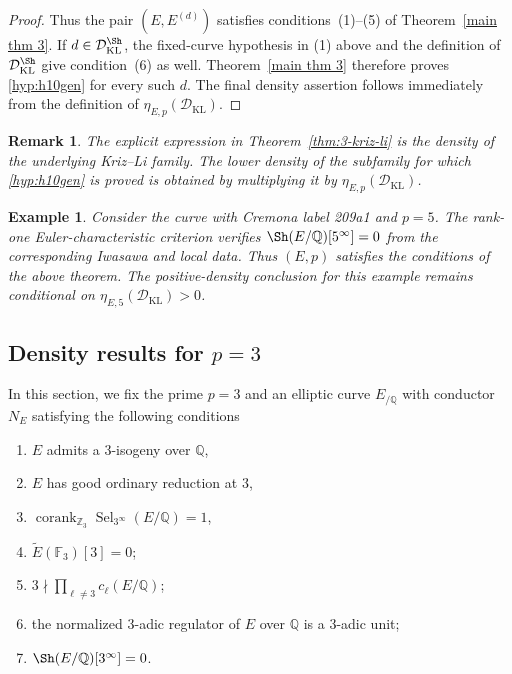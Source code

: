 \documentclass[12pt]{amsart}
\newtheorem{remark}[theorem]{Remark}
\newtheorem{example}[theorem]{Example}
\newcommand{\Z}{\mathbb{Z}}
\newcommand{\Q}{\mathbb{Q}}
\newcommand{\F}{\mathbb{F}}
\newcommand{\op}[1]{\operatorname{#1}}
\numberwithin{equation}{section}
\begin{document}
\begin{proof}
Thus the pair $(E,E^{(d)})$ satisfies conditions~(1)--(5) of Theorem~\ref{main thm 3}. If $d\in\mathcal D_{\mathrm{KL}}^{\Sh}$, the fixed-curve hypothesis in (1) above and the definition of $\mathcal D_{\mathrm{KL}}^{\Sh}$ give condition~(6) as well. Theorem~\ref{main thm 3} therefore proves \eqref{hyp:h10gen} for every such $d$. The final density assertion follows immediately from the definition of $\eta_{E,p}(\mathcal D_{\mathrm{KL}})$.
\end{proof}
\begin{remark}
The explicit expression in Theorem~\ref{thm:3-kriz-li} is the density of the underlying Kriz--Li family. The lower density of the subfamily for which \eqref{hyp:h10gen} is proved is obtained by multiplying it by $\eta_{E,p}(\mathcal D_{\mathrm{KL}})$.
\end{remark}
\begin{example}
Consider the curve with Cremona label 209a1 and $p=5$. The rank-one Euler-characteristic criterion verifies $\Sh(E/\Q)[5^\infty]=0$ from the corresponding Iwasawa and local data. Thus $(E,p)$ satisfies the conditions of the above theorem. The positive-density conclusion for this example remains conditional on $\eta_{E,5}(\mathcal D_{\mathrm{KL}})>0$.
\end{example}

\subsection{Density results for $p=3$}

\par In this section, we fix the prime $p=3$ and an elliptic curve $E_{/\Q}$ with conductor $N_E$ satisfying the following conditions 
\begin{enumerate}
    \item $E$ admits a $3$-isogeny over $\Q$,
    \item $E$ has good ordinary reduction at $3$, 
    \item $\op{corank}_{\Z_3} \op{Sel}_{3^\infty}(E/\Q)=1$, 
    \item $\widetilde{E}(\F_3)[3]=0$;
        \item $3\nmid \prod_{\ell\neq 3} c_\ell(E/\Q)$;
        \item the normalized $3$-adic regulator of $E$ over $\Q$ is a $3$-adic unit;
        \item $\Sh(E/\Q)[3^\infty]=0$.
\end{enumerate}
\end{document}
